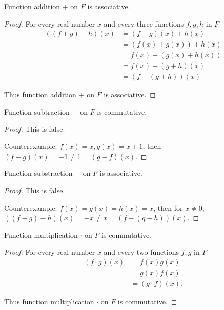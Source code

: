 \begin{exercise}
    Function addition $+$ on $F$ is associative.
\end{exercise}

\begin{proof}
    For every real number $x$ and every three functions $f, g, h$ in $F$
    \begin{align*}
        ((f + g) + h)(x) & = (f + g)(x) + h(x)    \\
                         & = (f(x) + g(x)) + h(x) \\
                         & = f(x) + (g(x) + h(x)) \\
                         & = f(x) + (g + h)(x)    \\
                         & = (f + (g + h))(x)
    \end{align*}

    Thus function addition $+$ on $F$ is associative.
\end{proof}

\begin{exercise}
    Function subtraction $-$ on $F$ is commutative.
\end{exercise}

\begin{proof}
    This is false.

    Counterexample: $f(x) = x, g(x) = x + 1$, then $(f - g)(x) = -1\ne 1 = (g - f)(x)$.
\end{proof}

\begin{exercise}
    Function substraction $-$ on $F$ is associative.
\end{exercise}

\begin{proof}
    This is false.

    Counterexample: $f(x) = g(x) = h(x) = x$, then for $x\ne 0$, $((f - g) - h)(x) = -x \ne x = (f - (g - h))(x)$.
\end{proof}

\begin{exercise}
    Function multiplication $\cdot$ on $F$ is commutative.
\end{exercise}

\begin{proof}
    For every real number $x$ and every two functions $f, g$ in $F$
    \begin{align*}
        (f\cdot g)(x) & = f(x)g(x)       \\
                      & = g(x)f(x)       \\
                      & = (g\cdot f)(x).
    \end{align*}

    Thus function multiplication $\cdot$ on $F$ is commutative.
\end{proof}

